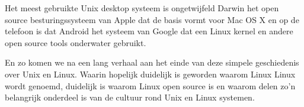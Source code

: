 Het meest gebruikte Unix desktop systeem is ongetwijfeld Darwin het open source besturingssysteem van Apple dat de basis
vormt voor Mac OS X en op de telefoon is dat Android het systeem van Google dat een Linux kernel en andere open source
tools onderwater gebruikt.\par

En zo komen we na een lang verhaal aan het einde van deze simpele geschiedenis over Unix en Linux. Waarin hopelijk duidelijk is geworden waarom Linux Linux wordt genoemd, duidelijk is waarom Linux open source is en waarom delen zo'n belangrijk onderdeel is van de cultuur rond Unix en Linux systemen.

